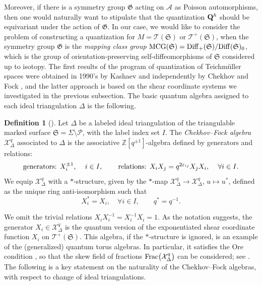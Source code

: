 \documentclass[10pt,a4paper]{amsart}
\numberwithin{equation}{section}
\theoremstyle{definition}
\newtheorem{Definition}[Theorem]{Definition}
\begin{document}
Moreover, if there is a symmetry group $\mathfrak{G}$ acting on $\mathcal{A}$ as Poisson automorphisms, then one would naturally want to stipulate that the quantization ${\bf Q}^\hbar$ should be equivariant under the action of $\mathfrak{G}$. In our case, we would like to consider the problem of constructing a quantization for $M = \mathscr{T}(\mathfrak{S})$ or $\mathscr{T}^+(\mathfrak{S})$, when the symmetry group $\mathfrak{G}$ is the {\em mapping class group} ${\rm MCG}(\mathfrak{S}) = {\rm Diff}_+(\mathfrak{S}) / {\rm Diff}(\mathfrak{S})_0$, which is the group of orientation-preserving self-diffeomorphisms of $\mathfrak{S}$ considered up to isotopy.
The first results of the program of quantization of Teichm\"uller spaces were obtained in 1990's by Kashaev \cite{Kash98} and independently by Chekhov and Fock \cite{F97, CF}, and the latter approach is based on the shear coordinate systems we investigated in the previous subsection. The basic quantum algebra assigned to each ideal triangulation $\Delta$ is the following.
\begin{Definition}[\cite{BL07,Liu}]
Let $\Delta$ be a labeled ideal triangulation of the triangulable marked surface $\mathfrak{S} = \Sigma \setminus \mathcal{P}$, with the label index set $I$. The {\em Chekhov--Fock algebra} $\mathcal{X}^q_\Delta$ associated to $\Delta$ is the associative $\mathbb{Z}[q^{\pm 1}]$-algebra defined by generators and relations:
\[
\mbox{generators: $X_i^{\pm 1}$, \quad $i \in I$, \qquad relations: $X_i X_j = q^{2\varepsilon_{ij}} X_j X_i$, \quad $\forall i \in I$}.
\]
We equip $\mathcal{X}^q_\Delta$ with a $*$-structure, given by the $*$-map $\mathcal{X}^q_\Delta \to \mathcal{X}^q_\Delta$, $u \mapsto u^*$, defined as the unique ring anti-isomorphism such that
\[
X_i^* = X_i, \quad \forall i \in I, \qquad q^* = q^{-1}.
\]
\end{Definition}
We omit the trivial relations $X_i X_i^{-1} = X_i^{-1} X_i=1$. As the notation suggests, the generator $X_i \in \mathcal{X}^q_\Delta$ is the quantum version of the exponentiated shear coordinate function $X_i$ on $\mathscr{T}^+(\mathfrak{S})$. This algebra, if the $*$-structure is ignored, is an example of the (generalized) quantum torus algebras. In particular, it satisfies the Ore condition \cite{Cohn}, so that the skew field of fractions ${\rm Frac}\bigl(\mathcal{X}^q_\Delta\bigr)$ can be considered; see \cite{BL07, KLS, Liu}.
The following is a key statement on the naturality of the Chekhov--Fock algebras, with respect to change of ideal triangulations.
\end{document}
